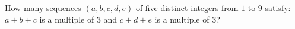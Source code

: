 How many sequences $(a,b,c,d,e)$ of five distinct integers from $1$ to $9$ satisfy: $a+b+c$ is a multiple of $3$ and $c+d+e$ is a multiple of $3$?
